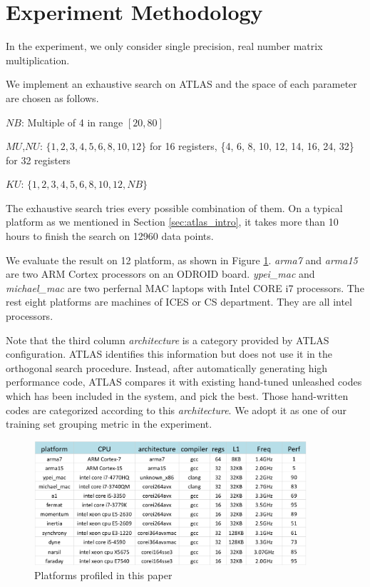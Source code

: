 \section{Experiment Methodology}
\label{sec:experiment}

In the experiment, we only consider single precision, real number matrix multiplication. 
\par
We implement an exhaustive search on ATLAS and the space of each parameter are chosen as follows.\par
$NB$: Multiple of 4 in range $[20, 80]$\par
$MU$,$NU$: $\{1, 2, 3, 4, 5, 6, 8, 10, 12\}$ for 16 registers,
		\{4, 6, 8, 10, 12, 14, 16, 24, 32\} for 32 registers\par
$KU$: $\{1, 2, 3, 4, 5, 6, 8, 10, 12, NB\}$\par
The exhaustive search tries every possible combination of them. 
On a typical platform as we mentioned in Section \ref{sec:atlas_intro}, it takes more than 10 hours to finish 
the search on 12960 data points.\par

We evaluate the result on 12 platform, as shown in Figure \ref{fig:platforms}. \textit{arma7} and \textit{arma15}
are two ARM Cortex processors on an ODROID board. 
\textit{ypei\_mac} and \textit{michael\_mac} are two perfernal MAC laptops 
with Intel CORE i7 processors. The rest eight platforms are machines of ICES or CS department. They are all intel processors.\par

Note that the third column \textit{architecture} is a category provided by ATLAS configuration. 
ATLAS identifies this information but does not use it in the orthogonal search procedure. Instead, after automatically 
generating high performance code, ATLAS compares it with existing hand-tuned unleashed codes which has been included in the system, 
and pick the best. Those hand-written codes are categorized according to this \textit{architecture}. 
We adopt it as one of our training set grouping metric in the experiment.\par



\begin{figure}[tbhp]
  \centering
  \includegraphics[width=0.9\textwidth]{images/platforms.png}
  \caption{Platforms profiled in this paper}
  \label{fig:platforms}
\end{figure}



